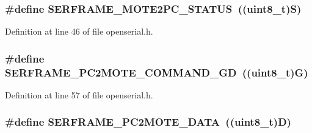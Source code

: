 \subsubsection[{\texorpdfstring{S\+E\+R\+F\+R\+A\+M\+E\+\_\+\+M\+O\+T\+E2\+P\+C\+\_\+\+S\+T\+A\+T\+US}{SERFRAME_MOTE2PC_STATUS}}]{\setlength{\rightskip}{0pt plus 5cm}\#define S\+E\+R\+F\+R\+A\+M\+E\+\_\+\+M\+O\+T\+E2\+P\+C\+\_\+\+S\+T\+A\+T\+US~(({\bf uint8\+\_\+t})\textquotesingle{}S\textquotesingle{})}\hypertarget{group___open_serial_ga4203a6f0869eb08957dc6ff6a6ee2530}{}\label{group___open_serial_ga4203a6f0869eb08957dc6ff6a6ee2530}


Definition at line 46 of file openserial.\+h.

\subsubsection[{\texorpdfstring{S\+E\+R\+F\+R\+A\+M\+E\+\_\+\+P\+C2\+M\+O\+T\+E\+\_\+\+C\+O\+M\+M\+A\+N\+D\+\_\+\+GD}{SERFRAME_PC2MOTE_COMMAND_GD}}]{\setlength{\rightskip}{0pt plus 5cm}\#define S\+E\+R\+F\+R\+A\+M\+E\+\_\+\+P\+C2\+M\+O\+T\+E\+\_\+\+C\+O\+M\+M\+A\+N\+D\+\_\+\+GD~(({\bf uint8\+\_\+t})\textquotesingle{}G\textquotesingle{})}\hypertarget{group___open_serial_ga2a7e44f17590c4c5562bc8df8b8240cc}{}\label{group___open_serial_ga2a7e44f17590c4c5562bc8df8b8240cc}


Definition at line 57 of file openserial.\+h.

\subsubsection[{\texorpdfstring{S\+E\+R\+F\+R\+A\+M\+E\+\_\+\+P\+C2\+M\+O\+T\+E\+\_\+\+D\+A\+TA}{SERFRAME_PC2MOTE_DATA}}]{\setlength{\rightskip}{0pt plus 5cm}\#define S\+E\+R\+F\+R\+A\+M\+E\+\_\+\+P\+C2\+M\+O\+T\+E\+\_\+\+D\+A\+TA~(({\bf uint8\+\_\+t})\textquotesingle{}D\textquotesingle{})}\hypertarget{group___open_serial_gafb648c9374f163a0fe504d132c2812bb}{}\label{group___open_serial_gafb648c9374f163a0fe504d132c2812bb}



